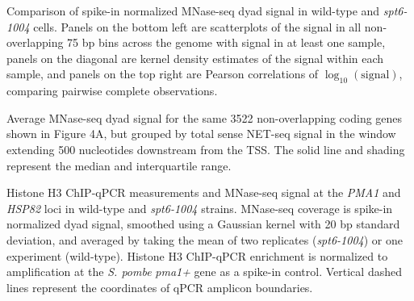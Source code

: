 \documentclass[9pt, letterpaper]{extarticle}
\begin{document}
\begin{description}[noitemsep, topsep=0pt, align=right, labelwidth=12pt, itemindent=0pt, leftmargin=0pt]
	\item [\textbf{(A)}] Comparison of spike-in normalized MNase-seq dyad signal in wild-type and \textit{spt6-1004} cells. Panels on the bottom left are scatterplots of the signal in all non-overlapping 75 bp bins across the genome with signal in at least one sample, panels on the diagonal are kernel density estimates of the signal within each sample, and panels on the top right are Pearson correlations of $\log_{10}\left(\text{signal} \right)$, comparing pairwise complete observations.
	\item [\textbf{(B)}] Average MNase-seq dyad signal for the same 3522 non-overlapping coding genes shown in Figure 4A, but grouped by total sense NET-seq signal in the window extending 500 nucleotides downstream from the TSS. The solid line and shading represent the median and interquartile range.
	\item [\textbf{(C)}] Histone H3 ChIP-qPCR measurements and MNase-seq signal at the \textit{PMA1} and \textit{HSP82} loci in wild-type and \textit{spt6-1004} strains. MNase-seq coverage is spike-in normalized dyad signal, smoothed using a Gaussian kernel with 20 bp standard deviation, and averaged by taking the mean of two replicates (\textit{spt6-1004}) or one experiment (wild-type). Histone H3 ChIP-qPCR enrichment is normalized to amplification at the \textit{S. pombe} \textit{pma1+} gene as a spike-in control. Vertical dashed lines represent the coordinates of qPCR amplicon boundaries.
\end{description}
\end{document}
